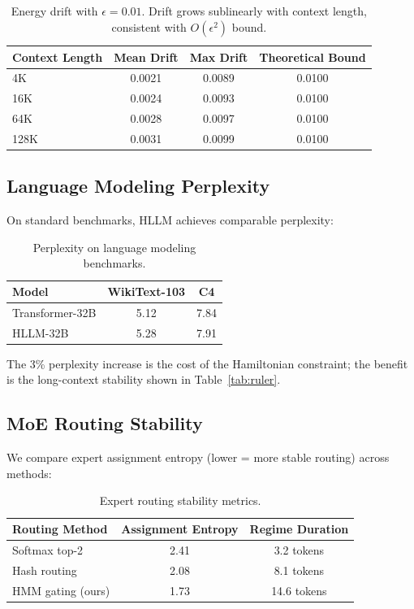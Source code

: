 \documentclass[11pt,letterpaper]{article}
\begin{document}
\begin{table}[t]
\centering
\begin{tabular}{lccc}
\toprule
\textbf{Context Length} & \textbf{Mean Drift} & \textbf{Max Drift} & \textbf{Theoretical Bound} \\
\midrule
4K & 0.0021 & 0.0089 & 0.0100 \\
16K & 0.0024 & 0.0093 & 0.0100 \\
64K & 0.0028 & 0.0097 & 0.0100 \\
128K & 0.0031 & 0.0099 & 0.0100 \\
\bottomrule
\end{tabular}
\caption{Energy drift with $\epsilon = 0.01$. Drift grows sublinearly with context length, consistent with $O(\epsilon^2)$ bound.}
\label{tab:drift}
\end{table}

\subsection{Language Modeling Perplexity}

On standard benchmarks, HLLM achieves comparable perplexity:

\begin{table}[t]
\centering
\begin{tabular}{lcc}
\toprule
\textbf{Model} & \textbf{WikiText-103} & \textbf{C4} \\
\midrule
Transformer-32B & 5.12 & 7.84 \\
HLLM-32B & 5.28 & 7.91 \\
\bottomrule
\end{tabular}
\caption{Perplexity on language modeling benchmarks.}
\label{tab:perplexity}
\end{table}

The 3\% perplexity increase is the cost of the Hamiltonian constraint; the benefit is the long-context stability shown in Table~\ref{tab:ruler}.

\subsection{MoE Routing Stability}

We compare expert assignment entropy (lower = more stable routing) across methods:

\begin{table}[t]
\centering
\begin{tabular}{lcc}
\toprule
\textbf{Routing Method} & \textbf{Assignment Entropy} & \textbf{Regime Duration} \\
\midrule
Softmax top-2 & 2.41 & 3.2 tokens \\
Hash routing & 2.08 & 8.1 tokens \\
HMM gating (ours) & 1.73 & 14.6 tokens \\
\bottomrule
\end{tabular}
\caption{Expert routing stability metrics.}
\label{tab:routing}
\end{table}
\end{document}
